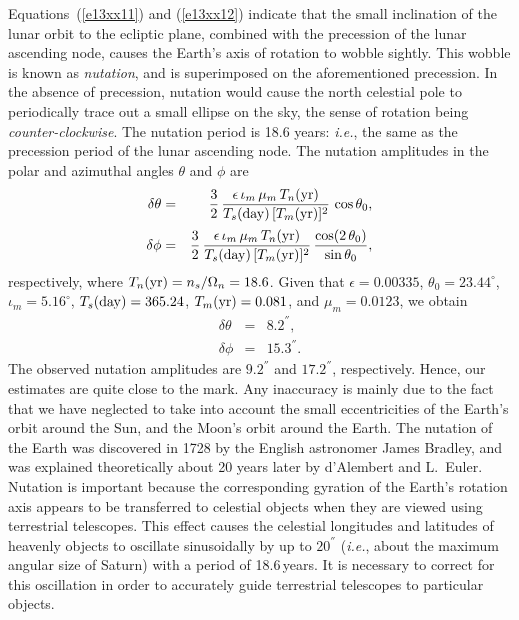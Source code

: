Equations~(\ref{e13xx11}) and (\ref{e13xx12}) indicate that the small inclination of the lunar orbit to the ecliptic
plane, combined with the precession  of the lunar ascending node, causes the Earth's axis of rotation to wobble
sightly. This wobble is known as {\em nutation}, and is superimposed on the aforementioned precession.  In the absence of
precession, nutation would
cause the north celestial pole to periodically trace out a small ellipse on the sky, the sense of rotation being
{\em counter-clockwise}. The
nutation period  is 18.6 years: {\em i.e.}, the same as the precession period of the lunar ascending node. 
The nutation amplitudes in the polar and azimuthal angles $\theta$ and $\phi$ are
\begin{eqnarray}
\delta\theta &= &\frac{3}{2}\,\frac{\epsilon\,\iota_m\,\mu_m\,T_n({\rm yr})}{T_s({\rm day})\,[T_m({\rm yr})]^2}\,\cos\theta_0,\\[0.4ex]
\delta\phi &=&\frac{3}{2}\,\frac{\epsilon\,\iota_m\,\mu_m\,T_n({\rm yr})}{T_s({\rm day})\,[T_m({\rm yr})]^2}\,\frac{\cos(2\,\theta_0)}{\sin\theta_0},
\end{eqnarray}
respectively, where $T_n({\rm yr}) = n_s/\Omega_n = 18.6$. Given
that $\epsilon=0.00335$, $\theta_0=23.44^\circ$, $\iota_m=5.16^\circ$, $T_s({\rm day})=365.24$, $T_m({\rm yr})=0.081$, and $\mu_m=0.0123$, we
obtain
\begin{eqnarray}
\delta\theta &=& 8.2^{''},\\[0.5ex]
\delta\phi &=& 15.3^{''}.
\end{eqnarray}
The observed nutation amplitudes are $9.2^{''}$ and $17.2^{''}$, respectively. Hence, our estimates are quite close to the
mark.  Any inaccuracy is mainly due to the fact that we have neglected to take into
account the small eccentricities of the Earth's orbit around the Sun, and the Moon's orbit around
the Earth. The nutation of the Earth was discovered in 1728 by the English astronomer James Bradley, and
was explained theoretically about 20 years later by d'Alembert and L.~Euler. Nutation is important because the corresponding gyration
of the Earth's rotation axis appears to be transferred to celestial objects when they are viewed using terrestrial 
telescopes. This effect causes the celestial longitudes and latitudes of heavenly objects to oscillate sinusoidally by up to $20^{''}$ ({\em i.e.}, about the maximum angular size of Saturn) with a period
of 18.6\,{\rm years}. It is necessary to correct for this oscillation in order to accurately guide terrestrial telescopes
to particular objects. 

